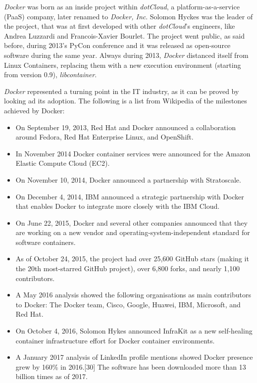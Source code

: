 \documentclass[a4paper,12pt]{article}
\begin{document}
\textit{Docker} was born as an inside project within \textit{dotCloud}, a
platform-as-a-service (PaaS) company, later renamed to \textit{Docker, Inc}.
Solomon Hyckes \cite{solomon_hyckes_wiki} was the leader of the project, that
was at first developed with other \textit{dotCloud}'s engineers, like Andrea
Luzzardi and Francois-Xavier Bourlet. The project went public, as said before,
during 2013's PyCon conference and it was released as open-source software
during the same year. Always during 2013, \textit{Docker} distanced itself from
Linux Containers, replacing them with a new execution environment (starting from
version 0.9), \textit{libcontainer}.\par \textit{Docker} represented a turning
point in the IT industry, as it can be proved by looking ad its adoption. The
following is a list from Wikipedia \cite{docker_history_wiki} of the milestones
achieved by Docker:
\begin{itemize}
  \item On September 19, 2013, Red Hat and Docker announced a collaboration
  around Fedora, Red Hat Enterprise Linux, and OpenShift.
  \item In November 2014 Docker container services were announced for the Amazon
  Elastic Compute Cloud (EC2).
  \item On November 10, 2014, Docker announced a partnership with
  Stratoscale.
  \item On December 4, 2014, IBM announced a strategic partnership with Docker
  that enables Docker to integrate more closely with the IBM Cloud.
  \item On June 22, 2015, Docker and several other companies announced that they
  are working on a new vendor and operating-system-independent standard for
  software containers.
  \item As of October 24, 2015, the project had over 25,600 GitHub stars (making
  it the 20th most-starred GitHub project), over 6,800 forks, and nearly 1,100
  contributors.
  \item A May 2016 analysis showed the following organisations as main
  contributors to Docker: The Docker team, Cisco, Google, Huawei, IBM,
  Microsoft, and Red Hat.
  \item On October 4, 2016, Solomon Hykes announced InfraKit as a new
  self-healing container infrastructure effort for Docker container
  environments.
  \item A January 2017 analysis of LinkedIn profile mentions showed Docker
  presence grew by 160\% in 2016.[30] The software has been downloaded more than
  13 billion times as of 2017.

\end{itemize}   
\end{document}

